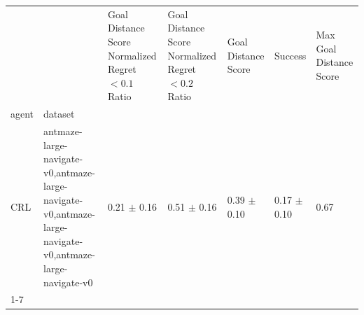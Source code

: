 \begin{tabular}{lllllll}
\toprule
 &  & Goal Distance Score Normalized Regret $< 0.1$ Ratio & Goal Distance Score Normalized Regret $< 0.2$ Ratio & Goal Distance Score & Success & Max Goal Distance Score \\
agent & dataset &  &  &  &  &  \\
\midrule
CRL & antmaze-large-navigate-v0,antmaze-large-navigate-v0,antmaze-large-navigate-v0,antmaze-large-navigate-v0 & 0.21 $\pm$ 0.16 & 0.51 $\pm$ 0.16 & 0.39 $\pm$ 0.10 & 0.17 $\pm$ 0.10 & 0.67 \\
\cline{1-7}
\bottomrule
\end{tabular}
